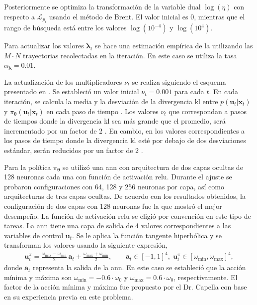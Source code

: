 Posteriormente se optimiza la transformación de la variable dual $\log(\eta)$ con respecto a $\mathcal{L}_{p_i}$ usando el método de Brent. El valor inicial es $0$, mientras que el rango de búsqueda está entre los valores $\log(10^{-4})$ y $\log(10^{4})$. 

Para actualizar los valores $\bm\lambda_{t}$ se hace una estimación empírica de la  utilizando las $M \cdot N$ trayectorias recolectadas en la iteración. En este caso se utiliza la tasa $\alpha_{\bm\lambda}=\text{0.01}$. 

La actualización de los multiplicadores $\nu_t$ se realiza siguiendo el esquema presentado en \cite{Deep_Visuomotor_Policies}. Se estableció un valor inicial $\nu_{t}=\text{0.001}$ para cada $t$. En cada iteración, se calcula la media y la desviación de la divergencia \acrshort{kl} entre $p(\mathbf{u}_t|\mathbf{x}_t)$ y $\pi_{\bm\theta}(\mathbf{u}_t|\mathbf{x}_t)$ en cada paso de tiempo \cite{Deep_Visuomotor_Policies}. Los valores $\nu_t$ que correspondan a pasos de tiempos donde la divergencia \acrshort{kl} sea más grande que el promedio, será incrementado por un factor de $2$ \cite{Deep_Visuomotor_Policies}. En cambio, en los valores correspondientes a los pasos de tiempo donde la divergencia \acrshort{kl} esté por debajo de dos desviaciones estándar, serán reducidos por un factor de $2$ \cite{Deep_Visuomotor_Policies}. 

Para la política $\pi_{\bm\theta}$ se utilizó una \acrshort{ann} con arquitectura de dos capas ocultas de 128 neuronas cada una con función de activación \acrshort{relu}. Durante el ajuste se probaron configuraciones con 64, 128 y 256 neuronas por capa, así como arquitecturas de tres capas ocultas. De acuerdo con los resultados obtenidos, la configuración de dos capas con 128 neuronas fue la que mostró el mejor desempeño. La función de activación \acrshort{relu} se eligió por convención en este tipo de tareas. La \acrshort{ann} tiene una capa de salida de 4 valores correspondientes a las variables de control $\mathbf{u}_t$. Se le aplica la función tangente hiperbólica y se transforman los valores usando la siguiente expresión, 
\begin{align}
\mathbf{u}_t^{\pi} = \frac{\omega_{\max} - \omega_{\min}}{2} \, \mathbf{a}_t + \frac{\omega_{\max} + \omega_{\min}}{2},
\qquad \mathbf{a}_t \in [-1, 1]^4, \; \mathbf{u}_t^{\pi} \in [\omega_{\min}, \omega_{\max}]^4,
\label{eq:action_transformation}
\end{align}
donde $\mathbf{a}_{t}$ representa la salida de la \acrshort{ann}. En este caso se estableció que la acción mínima y máxima son $\omega_{\min}=-\text{0.6}\cdot\omega_{0}$ y $\omega_{\max}=\text{0.6}\cdot\omega_{0}$, respectivamente. El factor de la acción mínima y máxima fue propuesto por el Dr. Capella con base en su experiencia previa en este problema. 

